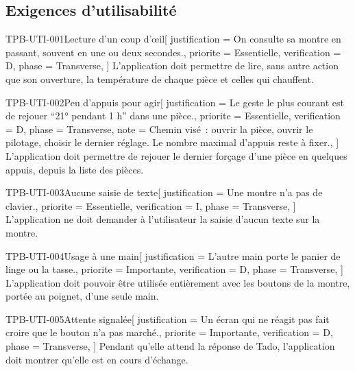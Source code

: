 \subsection{Exigences d'utilisabilité}

\begin{exigence}{TPB-UTI-001}{Lecture d'un coup d'œil}[
    justification = {On consulte sa montre en passant, souvent en une ou deux secondes.},
    priorite      = {Essentielle},
    verification  = {D},
    phase         = {Transverse},
  ]
  L'application doit permettre de lire, sans autre action que son ouverture, la
  température de chaque pièce et celles qui chauffent.
\end{exigence}

\begin{exigence}{TPB-UTI-002}{Peu d'appuis pour agir}[
    justification = {Le geste le plus courant est de rejouer \enquote{21° pendant 1 h} dans
                     une pièce.},
    priorite      = {Essentielle},
    verification  = {D},
    phase         = {Transverse},
    note          = {Chemin visé~: ouvrir la pièce, ouvrir le pilotage, choisir le dernier
                     réglage. Le nombre maximal d'appuis reste à fixer.},
  ]
  L'application doit permettre de rejouer le dernier forçage d'une pièce en quelques
  appuis, depuis la liste des pièces.
\end{exigence}

\begin{exigence}{TPB-UTI-003}{Aucune saisie de texte}[
    justification = {Une montre n'a pas de clavier.},
    priorite      = {Essentielle},
    verification  = {I},
    phase         = {Transverse},
  ]
  L'application ne doit demander à l'utilisateur la saisie d'aucun texte sur la montre.
\end{exigence}

\begin{exigence}{TPB-UTI-004}{Usage à une main}[
    justification = {L'autre main porte le panier de linge ou la tasse.},
    priorite      = {Importante},
    verification  = {D},
    phase         = {Transverse},
  ]
  L'application doit pouvoir être utilisée entièrement avec les boutons de la montre,
  portée au poignet, d'une seule main.
\end{exigence}

\begin{exigence}{TPB-UTI-005}{Attente signalée}[
    justification = {Un écran qui ne réagit pas fait croire que le bouton n'a pas
                     marché.},
    priorite      = {Importante},
    verification  = {D},
    phase         = {Transverse},
  ]
  Pendant qu'elle attend la réponse de Tado, l'application doit montrer qu'elle est en
  cours d'échange.
\end{exigence}

